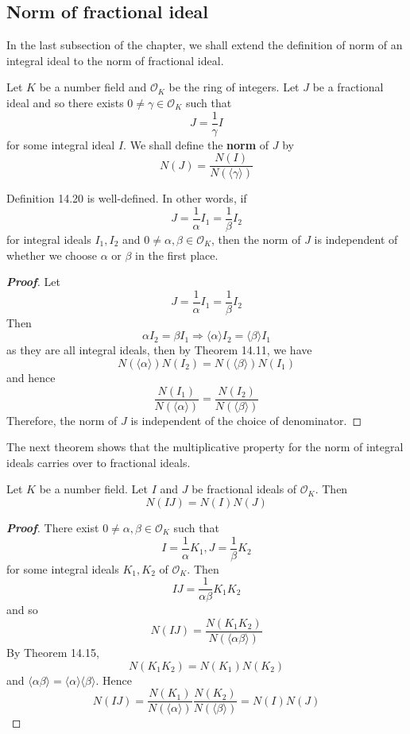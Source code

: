 \subsection{Norm of fractional ideal}
In the last subsection of the chapter, we shall extend the definition of norm of an integral ideal to the norm of fractional ideal.
\begin{definition} Let $K$ be a number field and $\mathcal{O}_K$ be the ring of integers. Let $J$ be a fractional ideal and so there exists $0 \neq \gamma \in \mathcal{O}_K$ such that
$$J=\frac{1}{\gamma}I$$ for some integral ideal $I$.
We shall define the {\bf norm} of $J$ by
$$N(J)=\frac{N(I)}{N(\langle \gamma \rangle)}$$
\end{definition}
\begin{proposition} Definition 14.20 is well-defined. In other words, if
$$J=\frac{1}{\alpha}I_1=\frac{1}{\beta}I_2$$
for integral ideals $I_1,I_2$ and $0 \neq \alpha,\beta \in \mathcal{O}_K$, then
the norm of $J$ is independent of whether we choose $\alpha$ or $\beta$ in the first place.
\end{proposition}
\begin{proof}[\bf Proof] Let
$$J=\frac{1}{\alpha}I_1=\frac{1}{\beta}I_2$$
Then
$$\alpha I_2=\beta I_1 \Rightarrow \langle \alpha \rangle I_2 =\langle \beta \rangle I_1$$
as they are all integral ideals, then by Theorem 14.11, we have
$$N(\langle \alpha \rangle)N(I_2)=N(\langle \beta \rangle)N(I_1)$$
and hence
$$\frac{N(I_1)}{N(\langle \alpha \rangle)}=\frac{N(I_2)}{N(\langle \beta \rangle)}$$
Therefore, the norm of $J$ is independent of the choice of denominator.
\end{proof}
The next theorem shows that the multiplicative property for the norm of integral ideals carries over to fractional ideals.
\begin{theorem} Let $K$ be a number field. Let $I$ and $J$ be fractional ideals of $\mathcal{O}_K$. Then
$$N(IJ)=N(I)N(J)$$
\end{theorem}
\begin{proof}[\bf Proof] There exist $0 \neq \alpha,\beta \in \mathcal{O}_K$ such that
$$I=\frac{1}{\alpha} K_1, J=\frac{1}{\beta} K_2$$
for some integral ideals $K_1,K_2$ of $\mathcal{O}_K$.
Then
$$IJ=\frac{1}{\alpha \beta}K_1 K_2$$
and so
$$N(IJ)=\frac{N(K_1 K_2)}{N(\langle \alpha \beta \rangle)}$$
By Theorem 14.15,
$$N(K_1K_2)=N(K_1)N(K_2)$$
and $\langle \alpha \beta \rangle =\langle \alpha \rangle \langle \beta \rangle$. Hence
$$N(IJ)=\frac{N(K_1)}{N(\langle \alpha \rangle)} \frac{N(K_2)}{N(\langle \beta \rangle)}=N(I)N(J)$$
\end{proof}
